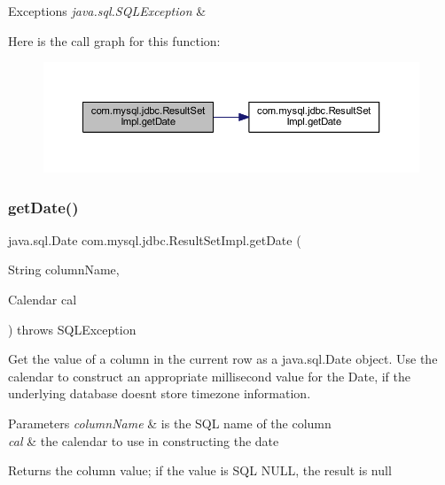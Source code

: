 \begin{DoxyExceptions}{Exceptions}
{\em java.\+sql.\+S\+Q\+L\+Exception} & \\
\hline
\end{DoxyExceptions}
Here is the call graph for this function\+:
\nopagebreak
\begin{figure}[H]
\begin{center}
\leavevmode
\includegraphics[width=350pt]{classcom_1_1mysql_1_1jdbc_1_1_result_set_impl_a288cad7ec14f83f34a5b9b5d927e17f6_cgraph}
\end{center}
\end{figure}
\mbox{\label{classcom_1_1mysql_1_1jdbc_1_1_result_set_impl_a0a7bdd217b0d581c313231156b7ec2be}} 
\subsubsection{\texorpdfstring{get\+Date()}{getDate()}\hspace{0.1cm}{\footnotesize\ttfamily [4/4]}}
{\footnotesize\ttfamily java.\+sql.\+Date com.\+mysql.\+jdbc.\+Result\+Set\+Impl.\+get\+Date (\begin{DoxyParamCaption}\item[{String}]{column\+Name,  }\item[{Calendar}]{cal }\end{DoxyParamCaption}) throws S\+Q\+L\+Exception}

Get the value of a column in the current row as a java.\+sql.\+Date object. Use the calendar to construct an appropriate millisecond value for the Date, if the underlying database doesn\textquotesingle{}t store timezone information.


\begin{DoxyParams}{Parameters}
{\em column\+Name} & is the S\+QL name of the column \\
\hline
{\em cal} & the calendar to use in constructing the date\\
\hline
\end{DoxyParams}
\begin{DoxyReturn}{Returns}
the column value; if the value is S\+QL N\+U\+LL, the result is null
\end{DoxyReturn}

